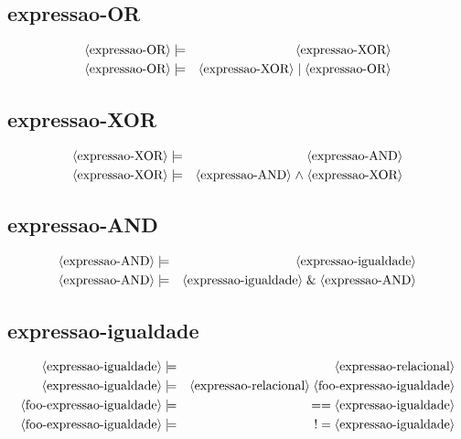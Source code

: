 \documentclass[12pt,a4papper]{article}
\newcommand{\pn}[1]{\langle \textnormal{#1} \rangle}
\newcommand{\pp}{\models}
\newcommand{\ww}{\;}
\newcommand{\sm}[1]{\textnormal{#1}}
\begin{document}
\begin{landscape}
\subsection{expressao-OR}
\begin{eqnarray}
\pn{expressao-OR} &\pp& \pn{expressao-XOR} \\
\pn{expressao-OR} &\pp& \pn{expressao-XOR} \ww \sm{$\mid$} \ww \pn{expressao-OR}
\end{eqnarray}


\subsection{expressao-XOR}
\begin{eqnarray}
\pn{expressao-XOR} &\pp& \pn{expressao-AND} \\
\pn{expressao-XOR} &\pp& \pn{expressao-AND} \ww \sm{$\wedge$} \ww \pn{expressao-XOR} 
\end{eqnarray}


\subsection{expressao-AND}
\begin{eqnarray}
\pn{expressao-AND} &\pp& \pn{expressao-igualdade} \\
\pn{expressao-AND} &\pp& \pn{expressao-igualdade} \ww \sm{\&} \ww \pn{expressao-AND}
\end{eqnarray}


\subsection{expressao-igualdade}
\begin{eqnarray}
\pn{expressao-igualdade} &\pp& \pn{expressao-relacional} \\
\pn{expressao-igualdade} &\pp& \pn{expressao-relacional} \ww \pn{foo-expressao-igualdade} \\
              \pn{foo-expressao-igualdade} &\pp& \sm{$==$} \ww \pn{expressao-igualdade} \\
              \pn{foo-expressao-igualdade} &\pp& \sm{$!=$} \ww \pn{expressao-igualdade}
\end{eqnarray}



\end{landscape}
\end{document}
